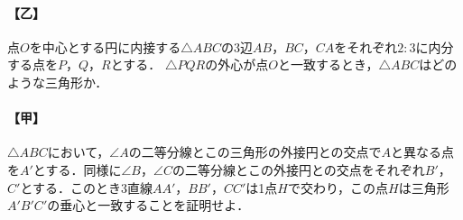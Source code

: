 \documentclass[../../main.tex]{subfiles}
\begin{document}
\paragraph{【乙】}
点$O$を中心とする円に内接する$\triangle ABC$の3辺$AB$，$BC$，$CA$をそれぞれ$2:3$に内分する点を$P$，$Q$，$R$とする．
$\triangle PQR$の外心が点$O$と一致するとき，$\triangle ABC$はどのような三角形か．

\paragraph{【甲】}
$\triangle ABC$において，$\angle A$の二等分線とこの三角形の外接円との交点で$A$と異なる点を$A'$とする．同様に$\angle B$，$\angle C$の二等分線とこの外接円との交点をそれぞれ$B'$，$C'$とする．このとき3直線$AA'$，$BB'$，$CC'$は1点$H$で交わり，この点$H$は三角形$A'B'C'$の垂心と一致することを証明せよ．
\end{document}
